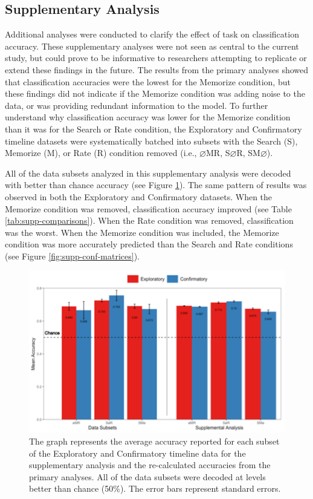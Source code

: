 \documentclass[
  english,
  man,floatsintext]{apa6}
\begin{document}
\endgroup

\clearpage
\makeatletter
\efloat@restorefloats
\makeatother


\begin{appendix}
\hypertarget{supplementary-analysis}{%
\section{Supplementary Analysis}\label{supplementary-analysis}}

Additional analyses were conducted to clarify the effect of task on
classification accuracy. These supplementary analyses were not seen as
central to the current study, but could prove to be informative to
researchers attempting to replicate or extend these findings in the
future. The results from the primary analyses showed that classification
accuracies were the lowest for the Memorize condition, but these
findings did not indicate if the Memorize condition was adding noise to
the data, or was providing redundant information to the model. To
further understand why classification accuracy was lower for the
Memorize condition than it was for the Search or Rate condition, the
Exploratory and Confirmatory timeline datasets were systematically
batched into subsets with the Search (S), Memorize (M), or Rate (R)
condition removed (i.e., \(\varnothing\)MR, S\(\varnothing\)R,
SM\(\varnothing\)).

All of the data subsets analyzed in this supplementary analysis were
decoded with better than chance accuracy (see Figure
\ref{fig:supp-chance}). The same pattern of results was observed in both
the Exploratory and Confirmatory datasets. When the Memorize condition
was removed, classification accuracy improved (see Table
\ref{tab:supp-comparisons}). When the Rate condition was removed,
classification was the worst. When the Memorize condition was included,
the Memorize condition was more accurately predicted than the Search and
Rate conditions (see Figure \ref{fig:supp-conf-matrices}).

\begin{figure}
\centering
\includegraphics{supplementary_analysis/recalc_orig_accs/recalc_bar_graph.png}
\caption{\label{fig:supp-chance}The graph represents the average accuracy
reported for each subset of the Exploratory and Confirmatory timeline
data for the supplementary analysis and the re-calculated accuracies
from the primary analyses. All of the data subsets were decoded at
levels better than chance (50\%). The error bars represent standard
errors.}
\end{figure}


\end{appendix}
\end{document}
